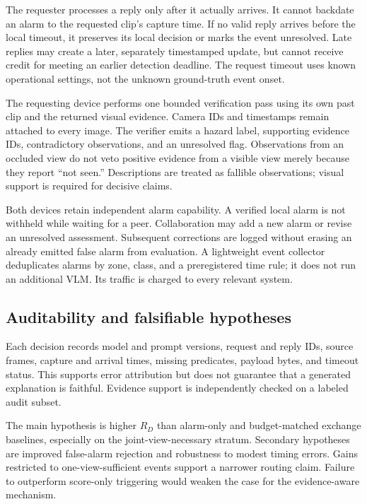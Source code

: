 \documentclass[10pt,a4paper]{article}
\begin{document}
The requester processes a reply only after it actually arrives. It cannot backdate an alarm to the requested clip's capture time. If no valid reply arrives before the local timeout, it preserves its local decision or marks the event unresolved. Late replies may create a later, separately timestamped update, but cannot receive credit for meeting an earlier detection deadline. The request timeout uses known operational settings, not the unknown ground-truth event onset.

The requesting device performs one bounded verification pass using its own past clip and the returned visual evidence. Camera IDs and timestamps remain attached to every image. The verifier emits a hazard label, supporting evidence IDs, contradictory observations, and an unresolved flag. Observations from an occluded view do not veto positive evidence from a visible view merely because they report ``not seen.'' Descriptions are treated as fallible observations; visual support is required for decisive claims.

Both devices retain independent alarm capability. A verified local alarm is not withheld while waiting for a peer. Collaboration may add a new alarm or revise an unresolved assessment. Subsequent corrections are logged without erasing an already emitted false alarm from evaluation. A lightweight event collector deduplicates alarms by zone, class, and a preregistered time rule; it does not run an additional VLM. Its traffic is charged to every relevant system.

\subsection{Auditability and falsifiable hypotheses}
Each decision records model and prompt versions, request and reply IDs, source frames, capture and arrival times, missing predicates, payload bytes, and timeout status. This supports error attribution but does not guarantee that a generated explanation is faithful. Evidence support is independently checked on a labeled audit subset.

The main hypothesis is higher $R_D$ than alarm-only and budget-matched exchange baselines, especially on the joint-view-necessary stratum. Secondary hypotheses are improved false-alarm rejection and robustness to modest timing errors. Gains restricted to one-view-sufficient events support a narrower routing claim. Failure to outperform score-only triggering would weaken the case for the evidence-aware mechanism.
\end{document}
